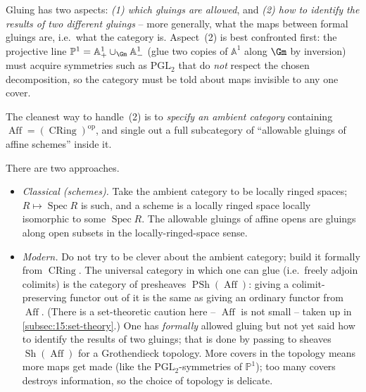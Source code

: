 \begin{remark}
\label{rmk:15:two-aspects}
Gluing has two aspects: \emph{(1) which gluings are allowed}, and \emph{(2) how to
identify the results of two different gluings} -- more generally, what the maps
between formal gluings are, i.e.\ what the category is. Aspect~(2) is best confronted
first: the projective line $\mathbb{P}^1 = \mathbb{A}^1_+ \cup_{\Gm} \mathbb{A}^1_-$
(glue two copies of $\mathbb{A}^1$ along $\Gm$ by inversion) must acquire symmetries
such as $\mathrm{PGL}_2$ that do \emph{not} respect the chosen decomposition, so the
category must be told about maps invisible to any one cover.
\end{remark}

The cleanest way to handle~(2) is to \emph{specify an ambient category} containing
$\operatorname{Aff} = (\operatorname{CRing})^{\mathrm{op}}$, and single out a full
subcategory of ``allowable gluings of affine schemes'' inside it.

\begin{remark}
\label{rmk:15:classical-modern}
There are two approaches.
\begin{itemize}
\item \emph{Classical (schemes).} Take the ambient category to be locally ringed
spaces; $R\mapsto \operatorname{Spec} R$ is such, and a scheme is a locally ringed
space locally isomorphic to some $\operatorname{Spec} R$. The allowable gluings of
affine opens are gluings along open subsets in the locally-ringed-space sense.
\item \emph{Modern.} Do not try to be clever about the ambient category; build it
formally from $\operatorname{CRing}$. The universal category in which one can glue
(i.e.\ freely adjoin colimits) is the category of presheaves
$\operatorname{PSh}(\operatorname{Aff})$: giving a colimit-preserving functor out of
it is the same as giving an ordinary functor from $\operatorname{Aff}$. (There is a
set-theoretic caution here -- $\operatorname{Aff}$ is not small -- taken up in
\cref{subsec:15:set-theory}.) One has \emph{formally} allowed gluing but not yet said
how to identify the results of two gluings; that is done by passing to sheaves
$\operatorname{Sh}(\operatorname{Aff})$ for a Grothendieck topology. More covers in
the topology means more maps get made (like the $\mathrm{PGL}_2$-symmetries of
$\mathbb{P}^1$); too many covers destroys information, so the choice of topology is
delicate.
\end{itemize}
\end{remark}

